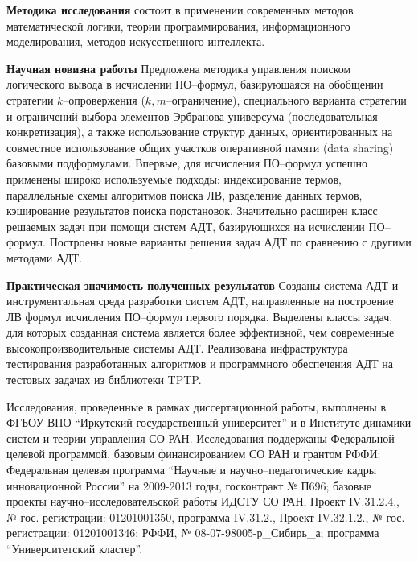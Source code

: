 \documentclass[a4paper]{report}
\begin{document}
\textbf{Методика исследования} состоит в применении современных методов математической логики, теории программирования, информационного моделирования, методов искусственного интеллекта.

\textbf{Научная новизна работы}
Предложена методика управления поиском логического вывода в исчислении ПО--формул, базирующаяся на обобщении стратегии $k$--опровержения ($k,m$--ограничение), специального варианта стратегии и ограничений выбора элементов Эрбранова универсума (последовательная конкретизация), а также использование структур данных, ориентированных на совместное использование общих участков оперативной памяти (data sharing) базовыми подформулами. Впервые, для исчисления ПО--формул успешно применены широко используемые подходы: индексирование термов, параллельные схемы алгоритмов поиска ЛВ, разделение данных термов, кэширование результатов поиска подстановок. Значительно расширен класс решаемых задач при помощи систем АДТ, базирующихся на исчислении ПО--формул. Построены новые варианты решения задач АДТ по сравнению с другими методами АДТ.

\textbf{Практическая значимость полученных результатов}
Созданы система АДТ и инструментальная среда разработки систем АДТ, направленные на построение ЛВ формул исчисления ПО--формул первого порядка. Выделены классы задач, для которых созданная система является более эффективной, чем современные высокопроизводительные системы АДТ. Реализована инфраструктура тестирования разработанных алгоритмов и программного обеспечения АДТ на тестовых задачах из библиотеки TPTP.


Исследования, проведенные в рамках  диссертационной работы, выполнены в ФГБОУ ВПО ``Иркутский государственный университет'' и в Институте динамики систем и теории управления СО РАН. Исследования поддержаны Федеральной целевой программой, базовым финансированием СО РАН и грантом РФФИ: Федеральная целевая программа ``Нау\-чные и нау\-чно--пе\-да\-го\-ги\-чес\-кие кадры инновационной России'' на 2009-2013 годы, госконтракт № П696; базовые проекты нау\-чно--иссле\-до\-ва\-тель\-ской работы ИДСТУ СО РАН, Проект IV.31.2.4., № гос. регистрации: 01201001350, программа IV.31.2., Проект IV.32.1.2., № гос. регистрации: 01201001346; РФФИ, № 08-07-98005-р\_Сибирь\_а; программа ``Университетский кластер''.
\end{document}
